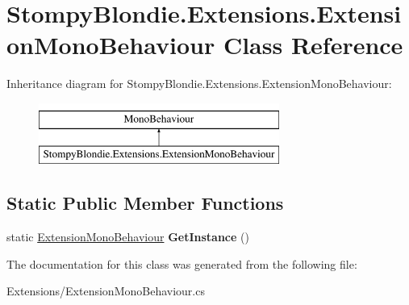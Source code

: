 \hypertarget{class_stompy_blondie_1_1_extensions_1_1_extension_mono_behaviour}{}\section{Stompy\+Blondie.\+Extensions.\+Extension\+Mono\+Behaviour Class Reference}
\label{class_stompy_blondie_1_1_extensions_1_1_extension_mono_behaviour}
Inheritance diagram for Stompy\+Blondie.\+Extensions.\+Extension\+Mono\+Behaviour\+:\begin{figure}[H]
\begin{center}
\leavevmode
\includegraphics[height=2.000000cm]{class_stompy_blondie_1_1_extensions_1_1_extension_mono_behaviour}
\end{center}
\end{figure}
\subsection*{Static Public Member Functions}
\begin{DoxyCompactItemize}
\item 
\mbox{\label{class_stompy_blondie_1_1_extensions_1_1_extension_mono_behaviour_a472cd1f5e863bf9d36b7a455167f2b97}} 
static \mbox{\hyperlink{class_stompy_blondie_1_1_extensions_1_1_extension_mono_behaviour}{Extension\+Mono\+Behaviour}} {\bfseries Get\+Instance} ()
\end{DoxyCompactItemize}


The documentation for this class was generated from the following file\+:\begin{DoxyCompactItemize}
\item 
Extensions/Extension\+Mono\+Behaviour.\+cs\end{DoxyCompactItemize}
